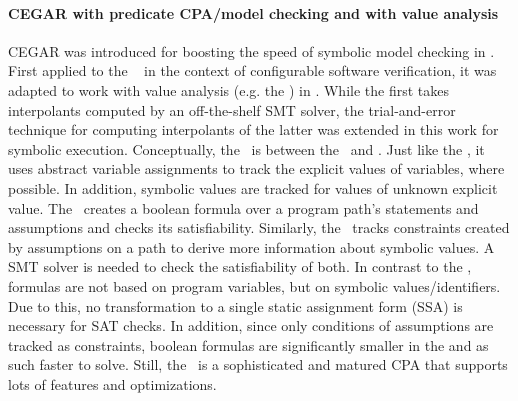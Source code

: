 \paragraph*{CEGAR with predicate CPA/model checking and with value analysis}
CEGAR was introduced for boosting the speed of symbolic model checking in \cite{Clarke2003}.
First applied to the \predicateCPA\ \cite{Beyer2012} in the context of configurable software verification,
it was adapted to work with value analysis (e.g. the ) in \cite{Beyer2013}.
While the first takes interpolants computed by an off-the-shelf SMT solver, the trial-and-error technique
for computing interpolants of the latter was extended in this work for symbolic execution.
Conceptually, the \symbolicExecutionCPA\ is between the \ and \predicateCPA.
Just like the , it uses abstract variable assignments to track the explicit values of variables, where possible.
In addition, symbolic values are tracked for values of unknown explicit value.
The \predicateCPA\ creates a boolean formula over a program path's statements and assumptions and checks its satisfiability.
Similarly, the \symbolicExecutionCPA\ tracks constraints created by assumptions on a path to derive more information about symbolic values.
A SMT solver is needed to check the satisfiability of both.
In contrast to the \predicateCPA, formulas are not based on program variables, but on symbolic values/identifiers.
Due to this, no transformation to a single static assignment form (SSA) is necessary for SAT checks.
In addition, since only conditions of assumptions are tracked as constraints, boolean formulas are significantly smaller in the \symbolicExecutionCPA
and as such faster to solve.
Still, the \predicateCPA\ is a sophisticated and matured CPA that supports lots of features and optimizations.
